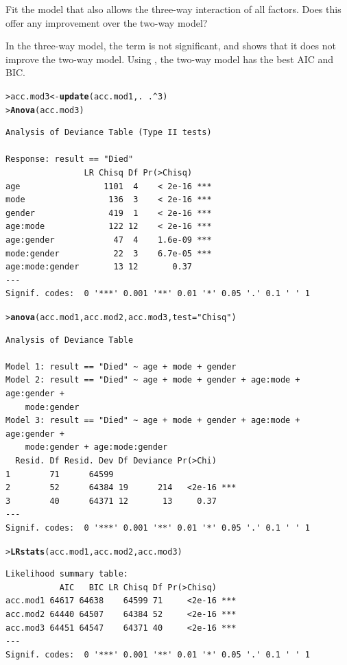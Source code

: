 \documentclass[10pt]{report}\usepackage[]{graphicx}\usepackage[]{color}
\makeatletter
\newcommand{\hlnum}[1]{\textcolor[rgb]{0.686,0.059,0.569}{#1}}%
\newcommand{\hlstr}[1]{\textcolor[rgb]{0.192,0.494,0.8}{#1}}%
\newcommand{\hlopt}[1]{\textcolor[rgb]{0,0,0}{#1}}%
\newcommand{\hlstd}[1]{\textcolor[rgb]{0.345,0.345,0.345}{#1}}%
\newcommand{\hlkwb}[1]{\textcolor[rgb]{0.69,0.353,0.396}{#1}}%
\newcommand{\hlkwc}[1]{\textcolor[rgb]{0.333,0.667,0.333}{#1}}%
\newcommand{\hlkwd}[1]{\textcolor[rgb]{0.737,0.353,0.396}{\textbf{#1}}}%
\newenvironment{kframe}{%
 \def\at@end@of@kframe{}%
 \ifinner\ifhmode%
  \def\at@end@of@kframe{\end{minipage}}%
  \begin{minipage}{\columnwidth}%
 \fi\fi%
 \def\FrameCommand##1{\hskip\@totalleftmargin \hskip-\fboxsep
 \colorbox{shadecolor}{##1}\hskip-\fboxsep
     \hskip-\linewidth \hskip-\@totalleftmargin \hskip\columnwidth}%
 \MakeFramed {\advance\hsize-\width
   \@totalleftmargin\z@ \linewidth\hsize
   \@setminipage}}%
 {\par\unskip\endMakeFramed%
 \at@end@of@kframe}
\newenvironment{knitrout}{}{} %
\renewenvironment{knitrout}{\small\renewcommand{\baselinestretch}{.85}}{} %
\makeatother
\begin{document}
\begin{Exercises}
\begin{enumerate*}
    \item Fit the model that also allows the three-way interaction of all factors.  Does this offer any 
    improvement over the two-way model?
    \begin{ans}
    In the three-way model, the term  is not significant, and 
    shows that it does not improve the two-way model. Using , the two-way model
    has the best AIC and BIC.
\begin{knitrout}\footnotesize
{}\color{fgcolor}\begin{kframe}
\begin{alltt}
\hlstd{> }\hlstd{acc.mod3} \hlkwb{<-} \hlkwd{update}\hlstd{(acc.mod1, .} \hlopt{~} \hlstd{.}\hlopt{^}\hlnum{3}\hlstd{)}
\hlstd{> }\hlkwd{Anova}\hlstd{(acc.mod3)}
\end{alltt}
\begin{verbatim}
Analysis of Deviance Table (Type II tests)

Response: result == "Died"
                LR Chisq Df Pr(>Chisq)    
age                 1101  4    < 2e-16 ***
mode                 136  3    < 2e-16 ***
gender               419  1    < 2e-16 ***
age:mode             122 12    < 2e-16 ***
age:gender            47  4    1.6e-09 ***
mode:gender           22  3    6.7e-05 ***
age:mode:gender       13 12       0.37    
---
Signif. codes:  0 '***' 0.001 '**' 0.01 '*' 0.05 '.' 0.1 ' ' 1
\end{verbatim}
\begin{alltt}
\hlstd{> }\hlkwd{anova}\hlstd{(acc.mod1, acc.mod2, acc.mod3,} \hlkwc{test}\hlstd{=}\hlstr{"Chisq"}\hlstd{)}
\end{alltt}
\begin{verbatim}
Analysis of Deviance Table

Model 1: result == "Died" ~ age + mode + gender
Model 2: result == "Died" ~ age + mode + gender + age:mode + age:gender + 
    mode:gender
Model 3: result == "Died" ~ age + mode + gender + age:mode + age:gender + 
    mode:gender + age:mode:gender
  Resid. Df Resid. Dev Df Deviance Pr(>Chi)    
1        71      64599                         
2        52      64384 19      214   <2e-16 ***
3        40      64371 12       13     0.37    
---
Signif. codes:  0 '***' 0.001 '**' 0.01 '*' 0.05 '.' 0.1 ' ' 1
\end{verbatim}
\begin{alltt}
\hlstd{> }\hlkwd{LRstats}\hlstd{(acc.mod1, acc.mod2, acc.mod3)}
\end{alltt}
\begin{verbatim}
Likelihood summary table:
           AIC   BIC LR Chisq Df Pr(>Chisq)    
acc.mod1 64617 64638    64599 71     <2e-16 ***
acc.mod2 64440 64507    64384 52     <2e-16 ***
acc.mod3 64451 64547    64371 40     <2e-16 ***
---
Signif. codes:  0 '***' 0.001 '**' 0.01 '*' 0.05 '.' 0.1 ' ' 1
\end{verbatim}
\end{kframe}
\end{knitrout}


\end{ans}
\end{enumerate*}
\end{Exercises}
\end{document}
